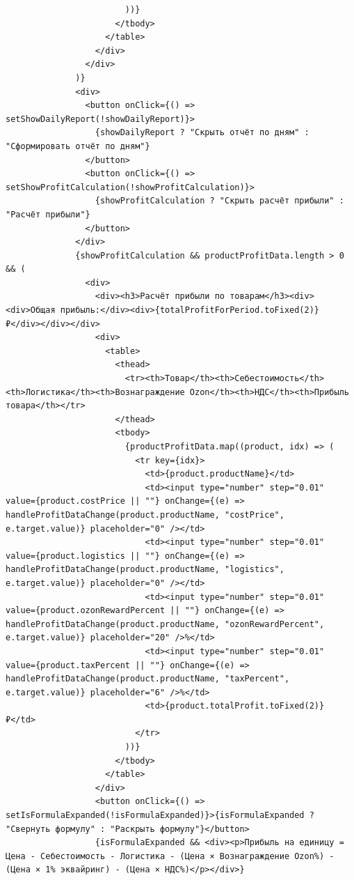 \begin{code}
\begin{verbatim}
                        ))}
                      </tbody>
                    </table>
                  </div>
                </div>
              )}
              <div>
                <button onClick={() => setShowDailyReport(!showDailyReport)}>
                  {showDailyReport ? "Скрыть отчёт по дням" : "Сформировать отчёт по дням"}
                </button>
                <button onClick={() => setShowProfitCalculation(!showProfitCalculation)}>
                  {showProfitCalculation ? "Скрыть расчёт прибыли" : "Расчёт прибыли"}
                </button>
              </div>
              {showProfitCalculation && productProfitData.length > 0 && (
                <div>
                  <div><h3>Расчёт прибыли по товарам</h3><div><div>Общая прибыль:</div><div>{totalProfitForPeriod.toFixed(2)} ₽</div></div></div>
                  <div>
                    <table>
                      <thead>
                        <tr><th>Товар</th><th>Себестоимость</th><th>Логистика</th><th>Вознаграждение Ozon</th><th>НДС</th><th>Прибыль товара</th></tr>
                      </thead>
                      <tbody>
                        {productProfitData.map((product, idx) => (
                          <tr key={idx}>
                            <td>{product.productName}</td>
                            <td><input type="number" step="0.01" value={product.costPrice || ""} onChange={(e) => handleProfitDataChange(product.productName, "costPrice", e.target.value)} placeholder="0" /></td>
                            <td><input type="number" step="0.01" value={product.logistics || ""} onChange={(e) => handleProfitDataChange(product.productName, "logistics", e.target.value)} placeholder="0" /></td>
                            <td><input type="number" step="0.01" value={product.ozonRewardPercent || ""} onChange={(e) => handleProfitDataChange(product.productName, "ozonRewardPercent", e.target.value)} placeholder="20" />%</td>
                            <td><input type="number" step="0.01" value={product.taxPercent || ""} onChange={(e) => handleProfitDataChange(product.productName, "taxPercent", e.target.value)} placeholder="6" />%</td>
                            <td>{product.totalProfit.toFixed(2)} ₽</td>
                          </tr>
                        ))}
                      </tbody>
                    </table>
                  </div>
                  <button onClick={() => setIsFormulaExpanded(!isFormulaExpanded)}>{isFormulaExpanded ? "Свернуть формулу" : "Раскрыть формулу"}</button>
                  {isFormulaExpanded && <div><p>Прибыль на единицу = Цена - Себестоимость - Логистика - (Цена × Вознаграждение Ozon%) - (Цена × 1% эквайринг) - (Цена × НДС%)</p></div>}

\end{verbatim}
\end{code}
